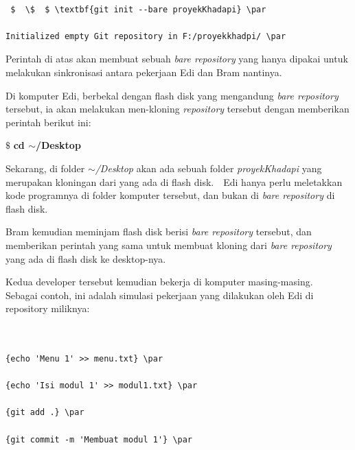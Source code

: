  
\begin{verbatim}

 $  \$  $ \textbf{git init --bare proyekKhadapi} \par

Initialized empty Git repository in F:/proyekkhadpi/ \par

\end{verbatim}
Perintah di atas akan membuat sebuah \textit{bare repository} yang hanya dipakai untuk melakukan sinkronisasi antara pekerjaan Edi dan Bram nantinya. \par
\vspace{12pt}
\noindent 
Di komputer Edi, berbekal dengan flash disk yang mengandung \textit{bare repository} tersebut, ia akan melakukan men-kloning \textit{repository} tersebut dengan memberikan perintah berikut ini: \par
\noindent 
 $  \$  $ \textbf{cd  $  \sim  $/Desktop} \par
\noindent 
\noindent 
\vspace{12pt}
\noindent 
\vspace{12pt}
\noindent 
Sekarang, di folder\textit{  $  \sim  $/Desktop} akan ada sebuah folder \textit{proyek}\textit{Khadapi} yang merupakan kloningan dari yang ada di flash disk. $  $ $  $ Edi hanya perlu meletakkan kode programnya di folder komputer tersebut, dan bukan di \textit{bare repository} di flash disk. \par
\vspace{12pt}
\noindent 
Bram kemudian meminjam flash disk berisi \textit{bare repository} tersebut, dan memberikan perintah yang sama untuk membuat kloning dari \textit{bare repository} yang ada di flash disk ke desktop-nya. \par
\vspace{12pt}
\noindent 
Kedua developer tersebut kemudian bekerja di komputer masing-masing. $  $ $  $ Sebagai contoh, ini adalah simulasi pekerjaan yang dilakukan oleh Edi di repository miliknya: \par
\noindent 
\begin{verbatim}


{echo 'Menu 1' >> menu.txt} \par
 
{echo 'Isi modul 1' >> modul1.txt} \par

{git add .} \par

{git commit -m 'Membuat modul 1'} \par

\end{verbatim}
